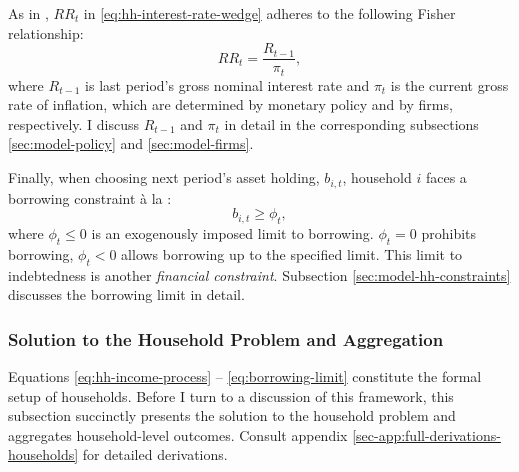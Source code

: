 \documentclass[a4paper,12pt]{article} %
\numberwithin{equation}{section} %
\numberwithin{figure}{section}
\numberwithin{table}{section}
\begin{document}
As in \textcite{auclert2021}, $RR_t$ in \eqref{eq:hh-interest-rate-wedge} adheres to the following Fisher relationship:
\begin{equation}
    RR_t = \frac{R_{t-1}}{\pi_t}, \label{eq:hh-fisher-equation}
\end{equation}
where $R_{t-1}$ is last period's gross nominal interest rate and $\pi_t$ is the current gross rate of inflation, which are determined by monetary policy and by firms, respectively. I discuss $R_{t-1}$ and $\pi_t$ in detail in the corresponding subsections \ref{sec:model-policy} and \ref{sec:model-firms}.

Finally, when choosing next period's asset holding, $b_{i,t}$, household $i$ faces a borrowing constraint à la \textcite{huggett1993}:
\begin{equation}
    b_{i,t} \ge \phi_t, \label{eq:borrowing-limit}
\end{equation}
where $\phi_t \le 0$ is an exogenously imposed limit to borrowing. $\phi_t = 0$ prohibits borrowing, $\phi_t < 0$ allows borrowing up to the specified limit. This limit to indebtedness is another \textit{financial constraint}. Subsection \ref{sec:model-hh-constraints} discusses the borrowing limit in detail.

\subsubsection{Solution to the Household Problem and Aggregation}
\label{sec:model-hh-solution}

Equations \eqref{eq:hh-income-process} -- \eqref{eq:borrowing-limit} constitute the formal setup of households. Before I turn to a discussion of this framework, this subsection succinctly presents the solution to the household problem and aggregates household-level outcomes. Consult appendix \ref{sec-app:full-derivations-households} for detailed derivations.
\end{document}
